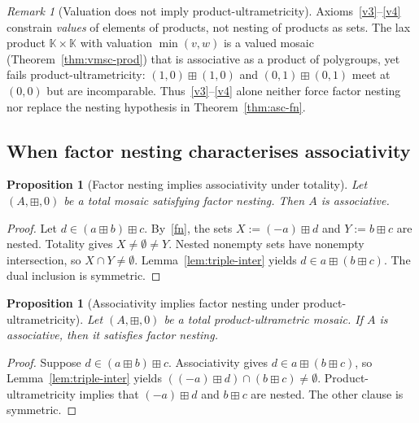 \documentclass[11pt]{amsart}
\theoremstyle{plain}
\newtheorem{proposition}[theorem]{Proposition}
\theoremstyle{definition}
\theoremstyle{remark}
\newtheorem{remark}[theorem]{Remark}
\begin{document}
\begin{remark}[Valuation does not imply product-ultrametricity]
\label{rem:val-not-ulm}
Axioms~\eqref{v3}--\eqref{v4} constrain \emph{values} of elements of products, not nesting of products as sets. The lax product \(\mathbb{K}\times\mathbb{K}\) with valuation \(\min(v,w)\) is a valued mosaic (Theorem~\ref{thm:vmsc-prod}) that is associative as a product of polygroups, yet fails product-ultrametricity: \((1,0)\boxplus(1,0)\) and \((0,1)\boxplus(0,1)\) meet at \((0,0)\) but are incomparable. Thus~\eqref{v3}--\eqref{v4} alone neither force factor nesting nor replace the nesting hypothesis in Theorem~\ref{thm:asc-fn}.
\end{remark}

\subsection{When factor nesting characterises associativity}

\begin{proposition}[Factor nesting implies associativity under totality]
\label{prop:fn-implies-asc}
Let \((A,\boxplus,0)\) be a total mosaic satisfying factor nesting. Then \(A\) is associative.
\end{proposition}

\begin{proof}
Let \(d\in(a\boxplus b)\boxplus c\). By~\eqref{fn}, the sets \(X:=(-a)\boxplus d\) and \(Y:=b\boxplus c\) are nested. Totality gives \(X\neq\emptyset\neq Y\). Nested nonempty sets have nonempty intersection, so \(X\cap Y\neq\emptyset\). Lemma~\ref{lem:triple-inter} yields \(d\in a\boxplus(b\boxplus c)\). The dual inclusion is symmetric.
\end{proof}

\begin{proposition}[Associativity implies factor nesting under product-ultrametricity]
\label{prop:asc-implies-fn}
Let \((A,\boxplus,0)\) be a total product-ultrametric mosaic. If \(A\) is associative, then it satisfies factor nesting.
\end{proposition}

\begin{proof}
Suppose \(d\in(a\boxplus b)\boxplus c\). Associativity gives \(d\in a\boxplus(b\boxplus c)\), so Lemma~\ref{lem:triple-inter} yields \(((-a)\boxplus d)\cap(b\boxplus c)\neq\emptyset\). Product-ultrametricity implies that \((-a)\boxplus d\) and \(b\boxplus c\) are nested. The other clause is symmetric.
\end{proof}
\end{document}
